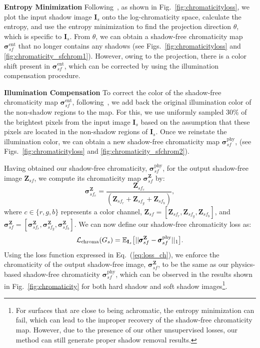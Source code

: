 \documentclass[10pt,twocolumn,letterpaper]{article}
\begin{document}
\vspace{0.2cm}
\noindent \textbf{Entropy Minimization} 
Following~\cite{Finlayson09}, as shown in Fig.~\ref{fig:chromaticityloss}, we plot the input shadow image $\mathbf{I}_s$ onto the log-chromaticity space, calculate the entropy, and use the entropy minimization to find the projection direction $\theta$, which is specific to $\mathbf{I}_s$. 
From $\theta$, we can obtain a shadow-free chromaticity map $\pmb{\sigma}_{sf}^{\text{ent}}$ that no longer contains any shadows (see Figs.~\ref{fig:chromaticityloss} and \ref{fig:chromaticity_sfchrom1}).
However, owing to the projection, there is a color shift present in $\pmb{\sigma}_{sf}^{\text{ent}}$, which can be corrected by using the illumination compensation procedure.

\vspace{0.2cm}
\noindent \textbf{Illumination Compensation} 
To correct the color of the shadow-free chromaticity map $\pmb{\sigma}_{sf}^{\text{ent}}$, following~\cite{Drew03}, we add back the original illumination color of the non-shadow regions to the map.
For this, we use uniformly sampled $30\%$ of the brightest pixels from the input image $\mathbf{I}_s$ based on the assumption that these pixels are located in the non-shadow regions of $\mathbf{I}_s$. 
Once we reinstate the illumination color, we can obtain a new shadow-free chromaticity map $\pmb{\sigma}_{sf}^\text{phy}$,  (see Figs.~\ref{fig:chromaticityloss} and \ref{fig:chromaticity_sfchrom2}).

Having obtained our shadow-free chromaticity, $\pmb{\sigma}_{sf}^\text{phy}$, for the output shadow-free image $\mathbf{Z}_{sf}$, we compute its chromaticity map $\pmb{\sigma}_{sf}^\mathbf{Z}$ by:
\begin{equation}
	\pmb{\sigma}_{{sf}_c}^\mathbf{Z}\!= \!\frac{\mathbf{Z}_{{sf}_c}}{(\mathbf{Z}_{{sf}_r} + \mathbf{Z}_{{sf}_g} + \mathbf{Z}_{{sf}_b})},
	\label{eq:rgchromaticity}
\end{equation}
where $c\in\{r,g,b\}$ represents a color channel, $\mathbf{Z}_{sf} = [\mathbf{Z}_{{sf}_r}, \mathbf{Z}_{{sf}_g}, \mathbf{Z}_{{sf}_b}]$, and $\pmb{\sigma}_{sf}^\mathbf{Z} = [\pmb{\sigma}_{{sf}_r}^\mathbf{Z}, \pmb{\sigma}_{{sf}_g}^\mathbf{Z}, \pmb{\sigma}_{{sf}_b}^\mathbf{Z}]$. We can now define our shadow-free chromaticity loss as:
\begin{equation}
	\mathcal{L}_{\rm chroma}(G_s) = \mathbb{E}_{\mathbf{I}_s} 
	\big[||\pmb{\sigma}_{sf}^\mathbf{Z} - \pmb{\sigma}_{sf}^\text{phy}||_{1}\big].
	\label{eq:loss_ch}
\end{equation}
Using the loss function expressed in Eq.~(\ref{eq:loss_ch}), we enforce the chromaticity of the output shadow-free image, $\pmb{\sigma}_{sf}^\mathbf{Z}$, to be the same as our physics-based shadow-free chromaticity $\pmb{\sigma}_{sf}^\text{phy}$, which can be observed in the results shown in Fig.~\ref{fig:chromaticity} for both hard shadow and soft shadow images\footnote{For surfaces that are close to being achromatic, the entropy minimization can fail, which can lead to the improper recovery of the shadow-free chromaticity map. However, due to the presence of our other unsupervised losses, our method can still generate proper shadow removal results.}.
\end{document}
